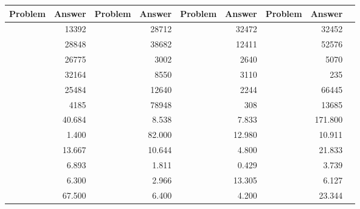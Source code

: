 \LARGE
\begin{tabular}{|l|r|r|r|r|r|r|r|r|}
\toprule
Problem &  Answer & Problem &  Answer & Problem &  Answer & Problem &   Answer \\ \midrule
\midrule
        &   13392 &         &   28712 &         &   32472 &         &    32452 \\ \midrule
        &   28848 &         &   38682 &         &   12411 &         &    52576 \\ \midrule
        &   26775 &         &    3002 &         &    2640 &         &     5070 \\ \midrule
        &   32164 &         &    8550 &         &    3110 &         &      235 \\ \midrule
        &   25484 &         &   12640 &         &    2244 &         &    66445 \\ \midrule
        &    4185 &         &   78948 &         &     308 &         &    13685 \\ \midrule
        &  40.684 &         &   8.538 &         &   7.833 &         &  171.800 \\ \midrule
        &   1.400 &         &  82.000 &         &  12.980 &         &   10.911 \\ \midrule
        &  13.667 &         &  10.644 &         &   4.800 &         &   21.833 \\ \midrule
        &   6.893 &         &   1.811 &         &   0.429 &         &    3.739 \\ \midrule
        &   6.300 &         &   2.966 &         &  13.305 &         &    6.127 \\ \midrule
        &  67.500 &         &   6.400 &         &   4.200 &         &   23.344 \\ \midrule
\bottomrule
\end{tabular}
